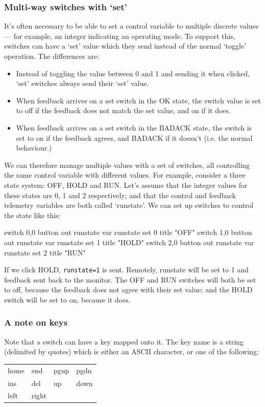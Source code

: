 \subsubsection{Multi-way switches with `set'}
It's often necessary to be able to set a control variable to multiple discrete values --- for example, an integer indicating an
operating mode. To support this, switches can have a `set' value which they send instead of the normal `toggle' operation. The differences
are:
\begin{itemize}
\item Instead of toggling the value between 0 and 1 and sending it when clicked, `set' switches always send their `set' value.
\item When feedback arrives on a set switch in the OK state, the switch value is set to off if the feedback does not match the set value,
and on if it does.
\item When feedback arrives on a set switch in the BADACK state, the switch is set to on if the feedback agrees, and BADACK if it doesn't (i.e.
the normal behaviour.)
\end{itemize}
We can therefore manage multiple values with a set of switches, all controlling the same control variable with different values. For example,
consider a three state system: OFF, HOLD and RUN. Let's assume that the integer values for these states are 0, 1 and 2 respectively; and that
the control and feedback telemetry variables are both called `runstate'. We can set up switches to control the state like this:
\begin{v}
    switch 0,0 { button out runstate var runstate set 0 title "OFF"}
    switch 1,0 { button out runstate var runstate set 1 title "HOLD"}
    switch 2,0 { button out runstate var runstate set 2 title "RUN"}
\end{v}
If we click HOLD, \texttt{runstate=1} is sent. Remotely, runstate will be set to 1 and feedback
sent back to the monitor. The OFF and RUN switches will both be set to off, because the feedback
does not agree with their set value; and the HOLD switch will be set to on, because it does.

\subsubsection{A note on keys}
Note that a switch can have a key mapped onto it. The key name is a string (delimited by quotes)
which is either an ASCII character, or one of the following:

\begin{center}
\begin{tabular}{llll}
home & end & pgup & pgdn \\
ins & del & up & down \\
left & right & \\
\end{tabular}
\end{center}


